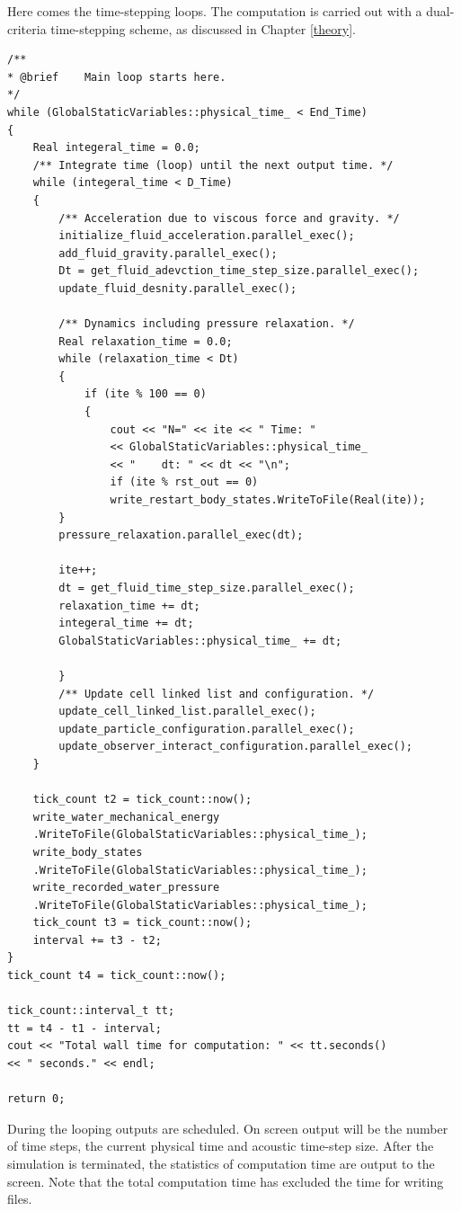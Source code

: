 \documentclass[12pt, a4paper,onecolumn]{article}
\begin{document}
Here comes the time-stepping loops. 
The computation is carried out with a dual-criteria time-stepping scheme,
as discussed in Chapter \ref{theory}.
%
\begin{lstlisting}[basicstyle=\ttfamily\footnotesize]
	/**
* @brief 	Main loop starts here.
*/
while (GlobalStaticVariables::physical_time_ < End_Time)
{
	Real integeral_time = 0.0;
	/** Integrate time (loop) until the next output time. */
	while (integeral_time < D_Time)
	{
		/** Acceleration due to viscous force and gravity. */
		initialize_fluid_acceleration.parallel_exec();
		add_fluid_gravity.parallel_exec();
		Dt = get_fluid_adevction_time_step_size.parallel_exec();
		update_fluid_desnity.parallel_exec();
		
		/** Dynamics including pressure relaxation. */
		Real relaxation_time = 0.0;
		while (relaxation_time < Dt)
		{
			if (ite % 100 == 0)
			{
				cout << "N=" << ite << " Time: "
				<< GlobalStaticVariables::physical_time_
				<< "	dt: " << dt << "\n";
				if (ite % rst_out == 0)
				write_restart_body_states.WriteToFile(Real(ite));
		}
		pressure_relaxation.parallel_exec(dt);
		
		ite++;
		dt = get_fluid_time_step_size.parallel_exec();
		relaxation_time += dt;
		integeral_time += dt;
		GlobalStaticVariables::physical_time_ += dt;
		
		}
		/** Update cell linked list and configuration. */
		update_cell_linked_list.parallel_exec();
		update_particle_configuration.parallel_exec();
		update_observer_interact_configuration.parallel_exec();
	}
	
	tick_count t2 = tick_count::now();
	write_water_mechanical_energy
	.WriteToFile(GlobalStaticVariables::physical_time_);
	write_body_states
	.WriteToFile(GlobalStaticVariables::physical_time_);
	write_recorded_water_pressure
	.WriteToFile(GlobalStaticVariables::physical_time_);
	tick_count t3 = tick_count::now();
	interval += t3 - t2;
}
tick_count t4 = tick_count::now();

tick_count::interval_t tt;
tt = t4 - t1 - interval;
cout << "Total wall time for computation: " << tt.seconds()
<< " seconds." << endl;

return 0;
\end{lstlisting}
%
During the looping outputs are scheduled.
On screen output will be the number of time steps, 
the current physical time and acoustic time-step size.
After the simulation is terminated, the statistics of computation time are output to the screen.
Note that the total computation time has excluded the time for writing files.
\end{document}
